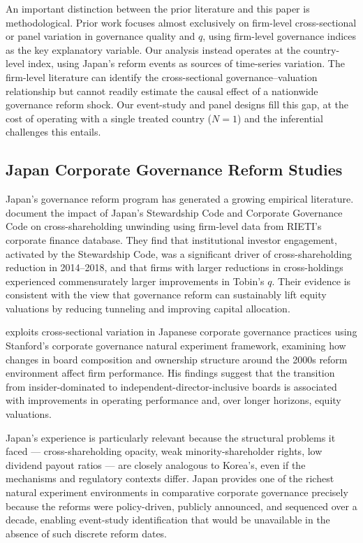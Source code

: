 \documentclass[12pt]{article}
\begin{document}
An important distinction between the prior literature and this paper is methodological.
Prior work focuses almost exclusively on firm-level cross-sectional or panel variation in
governance quality and $q$, using firm-level governance indices as the key explanatory
variable. Our analysis instead operates at the country-level index, using Japan's reform
events as sources of time-series variation. The firm-level literature can identify the
cross-sectional governance--valuation relationship but cannot readily estimate the causal
effect of a nationwide governance reform shock. Our event-study and panel designs fill
this gap, at the cost of operating with a single treated country ($N=1$) and the inferential
challenges this entails.

\subsection{Japan Corporate Governance Reform Studies}

Japan's governance reform program has generated a growing empirical literature. \citet{miyajima2023}
document the impact of Japan's Stewardship Code and Corporate Governance Code on
cross-shareholding unwinding using firm-level data from RIETI's corporate finance database.
They find that institutional investor engagement, activated by the Stewardship Code, was a
significant driver of cross-shareholding reduction in 2014--2018, and that firms with larger
reductions in cross-holdings experienced commensurately larger improvements in Tobin's $q$.
Their evidence is consistent with the view that governance reform can sustainably lift
equity valuations by reducing tunneling and improving capital allocation.

\citet{eberhart2012} exploits cross-sectional variation in Japanese corporate governance
practices using Stanford's corporate governance natural experiment framework, examining
how changes in board composition and ownership structure around the 2000s reform environment
affect firm performance. His findings suggest that the transition from insider-dominated to
independent-director-inclusive boards is associated with improvements in operating performance
and, over longer horizons, equity valuations.

Japan's experience is particularly relevant because the structural problems it faced ---
cross-shareholding opacity, weak minority-shareholder rights, low dividend payout ratios ---
are closely analogous to Korea's, even if the mechanisms and regulatory contexts differ.
Japan provides one of the richest natural experiment environments in comparative corporate
governance precisely because the reforms were policy-driven, publicly announced, and
sequenced over a decade, enabling event-study identification that would be unavailable
in the absence of such discrete reform dates.
\end{document}
